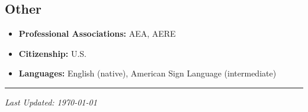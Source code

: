 \documentclass[11pt]{res} %
\begin{document}
\begin{resume}

\subsection{Other}

\begin{itemize}
	\item[] \textbf{Professional Associations:} AEA, AERE
	\item[] \textbf{Citizenship:} U.S.
	\item[] \textbf{Languages:} English (native), American Sign Language (intermediate)
\end{itemize}
\hrule

\vspace{0.1in} %



\centerline{\emph{Last Updated: \today}}
\pagebreak



\end{resume}
\end{document}

